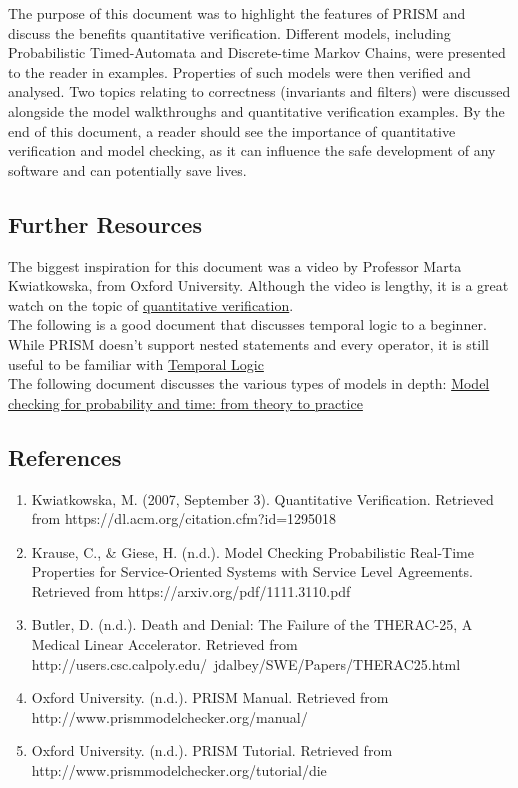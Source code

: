 \documentclass[a4paper]{article}
\begin{document}
The purpose of this document was to highlight the features of PRISM and discuss the benefits quantitative verification. Different models, including Probabilistic Timed-Automata and Discrete-time Markov Chains, were presented to the reader in examples. Properties of such models were then verified and analysed. Two topics relating to correctness (invariants and filters) were discussed alongside the model walkthroughs and quantitative verification examples. By the end of this document, a reader should see the importance of quantitative verification and model checking, as it can influence the safe development of any software and can potentially save lives.
\subsection{Further Resources}

The biggest inspiration for this document was a video by Professor Marta Kwiatkowska, from Oxford University. Although the video is lengthy, it is a great watch on the topic of \href{https://www.youtube.com/watch?v=R62uwR6_YhQ}{quantitative verification}.
\\[1\baselineskip]
The following is a good document that discusses temporal logic to a beginner. While PRISM doesn't support nested statements and every operator, it is still useful to be familiar with \href{https://www.cl.cam.ac.uk/~djg11/pubs/temporal.html}{Temporal Logic}
\\[1\baselineskip]
The following document discusses the various types of models in depth: \href{http://qav.comlab.ox.ac.uk/papers/lics03.pdf}{Model checking for probability and time: from theory to practice}

\subsection{References}
\begin{enumerate}
\item Kwiatkowska, M. (2007, September 3). Quantitative Verification. Retrieved from \newline https://dl.acm.org/citation.cfm?id=1295018
\item Krause, C., \& Giese, H. (n.d.). Model Checking Probabilistic Real-Time Properties for Service-Oriented Systems with Service Level Agreements. Retrieved from https://arxiv.org/pdf/1111.3110.pdf
\item Butler, D. (n.d.). Death and Denial: The Failure of the THERAC-25, A Medical Linear Accelerator. Retrieved from http://users.csc.calpoly.edu/~jdalbey/SWE/Papers/THERAC25.html
\item Oxford University. (n.d.). PRISM Manual. Retrieved from http://www.prismmodelchecker.org/manual/
\item Oxford University. (n.d.). PRISM Tutorial. Retrieved from http://www.prismmodelchecker.org/tutorial/die

\end{enumerate}
\end{document}
